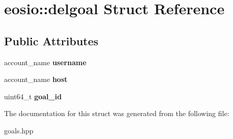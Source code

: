 \hypertarget{structeosio_1_1delgoal}{}\section{eosio\+:\+:delgoal Struct Reference}
\label{structeosio_1_1delgoal}
\subsection*{Public Attributes}
\begin{DoxyCompactItemize}
\item 
\mbox{\label{structeosio_1_1delgoal_a498b2b7917d1e43e9229e63f0ac99833}} 
account\+\_\+name {\bfseries username}
\item 
\mbox{\label{structeosio_1_1delgoal_a4b4ff3e6e2a50f702c826ce1251f9e11}} 
account\+\_\+name {\bfseries host}
\item 
\mbox{\label{structeosio_1_1delgoal_aa3d713d71ad4db196597a8a1e36f4e81}} 
uint64\+\_\+t {\bfseries goal\+\_\+id}
\end{DoxyCompactItemize}


The documentation for this struct was generated from the following file\+:\begin{DoxyCompactItemize}
\item 
goals.\+hpp\end{DoxyCompactItemize}
